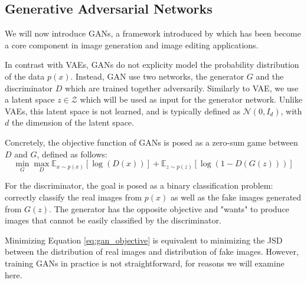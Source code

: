 \subsection{Generative Adversarial Networks}\label{sec:gans}


We will now introduce \ac{GAN}s, a framework introduced by \cite{goodfellow2014gan}
which has been become a core component in image generation and image editing applications. 


In contrast with \ac{VAE}s, \ac{GAN}s do not explicity model the probability 
distribution of the data $p(x)$. Instead, \ac{GAN} use two networks, the generator $G$ 
and the discriminator $D$ which are trained together adversarily. Similarly to 
\ac{VAE}, we use a latent space ${z \in \mathcal{Z}}$ which will be used as input for the 
generator network. Unlike \ac{VAE}s, this latent space is not learned, and is 
typically defined as $\mathcal{N}(0, I_d)$, with $d$ the dimension of the latent space. 

Concretely, the 
objective function of \ac{GAN}s is posed as a zero-sum game between $D$ and $G$, defined 
as follows:
\begin{equation}\label{eq:gan_objective}
      \min_{G}\max_{D}\mathbb{E}_{x\sim p(x)}[\log(D(x))] + \mathbb{E}_{z\sim p(z)}[\log(1 - D(G(z)))]
\end{equation}

For the discriminator, the goal is posed as a binary classification problem: 
correctly classify the real images from $p(x)$ as well as the fake images generated 
from $G(z)$. The generator has the opposite objective and "wants" to produce 
images that cannot be easily classified by the discriminator. 

Minimizing Equation \ref{eq:gan_objective} is equivalent to minimizing the \ac{JSD} between the 
distribution of real images and distribution of fake images. However, 
training GANs in practice is not straightforward, for reasons we will examine here.

